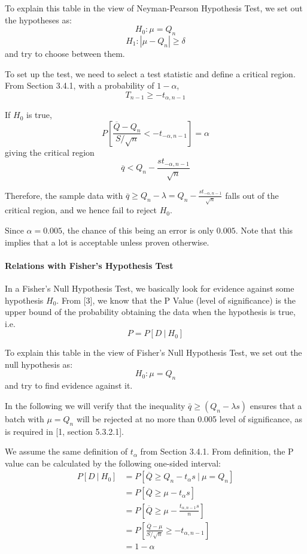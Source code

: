 \documentclass[a4paper]{article}
\begin{document}
To explain this table in the view of Neyman-Pearson Hypothesis Test, we set out the hypotheses as:
$$H_0: \mu = Q_n$$
$$H_1: |\mu-Q_n| \geq \delta$$
and try to choose between them.

To set up the test, we need to select a test statistic and define a critical region. From Section 3.4.1, with a probability of $1-\alpha$,
$$T_{n-1} \geq -t_{\alpha,n-1}$$

If $H_0$ is true,
$$P[\frac{\overline{Q}-Q_n}{S/\sqrt{n}}<-t_{-\alpha,n-1}] = \alpha$$
giving the critical region
$$\overline{q} < Q_n - \frac{st_{-\alpha,n-1}}{\sqrt{n}}$$

Therefore, the sample data with $\overline{q} \geq Q_n - \lambda = Q_n - \displaystyle\frac{st_{-\alpha,n-1}}{\sqrt{n}}$ falls out of the critical region, and we hence fail to reject $H_0$. 

Since $\alpha = 0.005$, the chance of this being an error is only $0.005$. Note that this implies that a lot is acceptable unless proven otherwise.

\paragraph{Relations with Fisher's Hypothesis Test}
In a Fisher's Null Hypothesis Test, we basically look for evidence against some hypothesis $H_0$. From [3], we know that the P Value (level of significance) is the upper bound of the probability obtaining the data when the hypothesis is true, i.e.
$$P=P[D\ |\ H_0]$$

To explain this table in the view of Fisher's Null Hypothesis Test, we set out the null hypothesis as:
$$H_0: \mu = Q_n$$
and try to find evidence against it.

In the following we will verify that the inequality $\bar{q}\geq (Q_n-\lambda s)$ ensures that a batch with $\mu=Q_n$ will be rejected at no more than 0.005 level of significance, as is required in [1, section 5.3.2.1].

We assume the same definition of $t_{\alpha}$ from Section 3.4.1. From definition, the P value can be calculated by the following one-sided interval:
\begin{align*}
P[D\ |\ H_0]
&= P[\overline{Q} \geq Q_n - t_{\alpha}s\ |\ \mu = Q_n]\\
&= P[\overline{Q} \geq \mu - t_{\alpha}s]\\
&= P[\overline{Q} \geq \mu - \frac{t_{\alpha,n-1}s}{n}]\\
&= P[\frac{\overline{Q}-\mu}{S/\sqrt{n}}\geq - t_{\alpha,n-1}]\\
&= 1-\alpha
\end{align*}
\end{document}

